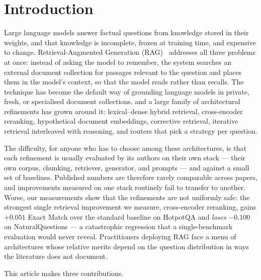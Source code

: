 \section{Introduction}
\label{sec:introduction}

Large language models answer factual questions from knowledge stored in their
weights, and that knowledge is incomplete, frozen at training time, and
expensive to change. Retrieval-Augmented Generation
(RAG)~\citep{lewis2020rag} addresses all three problems at once: instead of
asking the model to remember, the system searches an external document
collection for passages relevant to the question and places them in the
model's context, so that the model reads rather than recalls. The technique
has become the default way of grounding language models in private,
fresh, or specialised document collections, and a large family of
architectural refinements has grown around it: lexical--dense hybrid
retrieval, cross-encoder reranking, hypothetical document embeddings,
corrective retrieval, iterative retrieval interleaved with reasoning, and
routers that pick a strategy per question.

The difficulty, for anyone who has to choose among these architectures, is
that each refinement is usually evaluated by its authors on their own stack
--- their own corpus, chunking, retriever, generator, and prompts --- and
against a small set of baselines. Published numbers are therefore rarely
comparable across papers, and improvements measured on one stack routinely
fail to transfer to another. Worse, our measurements show that the
refinements are not uniformly safe: the strongest single retrieval
improvement we measure, cross-encoder reranking, gains
$+0.051$ Exact Match over the standard baseline on HotpotQA and
\emph{loses} $-0.100$ on NaturalQuestions --- a catastrophic regression that
a single-benchmark evaluation would never reveal. Practitioners deploying
RAG face a menu of architectures whose relative merits depend on the
question distribution in ways the literature does not document.

This article makes three contributions.

